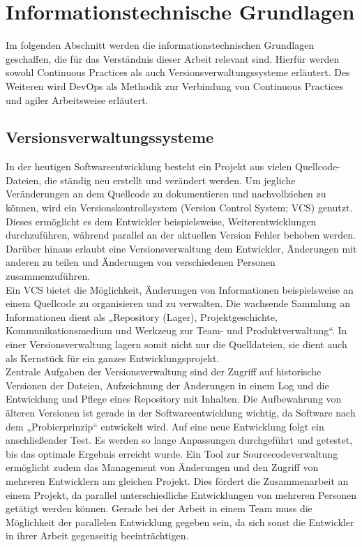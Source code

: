 \chapter{Informationstechnische Grundlagen} 
Im folgenden Abschnitt werden die informationstechnischen Grundlagen geschaffen, die für das Verständnis dieser Arbeit relevant sind. Hierfür werden sowohl Continuous Practices als auch Versionsverwaltungssysteme erläutert. Des Weiteren wird DevOps als Methodik zur Verbindung von Continuous Practices und agiler Arbeitsweise erläutert.
\section{Versionsverwaltungssysteme}\label{vcs}
In der heutigen Softwareentwicklung besteht ein Projekt aus vielen Quellcode-Dateien, die ständig neu erstellt und verändert werden. Um jegliche Veränderungen an dem Quellcode zu dokumentieren und nachvollziehen zu können, wird ein Versionskontrollsystem (Version Control System; VCS) genutzt.\autocite[Vgl.][S.6]{Baerisch.2005}  
Dieses ermöglicht es dem Entwickler beispielsweise, Weiterentwicklungen durchzuführen, während parallel an der aktuellen Version Fehler behoben werden. Darüber hinaus erlaubt eine Versionsverwaltung dem Entwickler, Änderungen mit anderen zu teilen und Änderungen von verschiedenen Personen zusammenzuführen.\autocite[Vgl.][S.9]{Kleine.2012} \\
Ein VCS bietet die Möglichkeit, Änderungen von Informationen beispielsweise an einem Quellcode zu organisieren und zu verwalten. \autocite[Vgl.][S.1]{Pilato.2009}
Die wachsende Sammlung an Informationen dient als „Repository (Lager), Projektgeschichte, Kommunikationsmedium und Werkzeug zur Team- und Produktverwaltung“.\autocite[][S.1]{Loeliger.2010} In einer Versionsverwaltung lagern somit nicht nur die Quelldateien, sie dient auch als Kernstück für ein ganzes Entwicklungsprojekt. \\
Zentrale Aufgaben der Versionsverwaltung sind der Zugriff auf historische Versionen der Dateien, Aufzeichnung der Änderungen in einem Log und die Entwicklung und Pflege eines Repository mit Inhalten. Die Aufbewahrung von älteren Versionen ist gerade in der Softwareentwicklung wichtig, da Software nach dem „Probierprinzip“\autocite[][S.9]{Versteegen.2003} entwickelt wird. Auf eine neue Entwicklung folgt ein anschließender Test. Es werden so lange Anpassungen durchgeführt und getestet, bis das optimale Ergebnis erreicht wurde.\autocite[Vgl.][S.9]{Versteegen.2003}
Ein Tool zur Sourcecodeverwaltung ermöglicht zudem das Management von Änderungen und den Zugriff von mehreren Entwicklern am gleichen Projekt.\autocite[Vgl.][S.1]{Loeliger.2010} Dies fördert die Zusammenarbeit an einem Projekt, da parallel unterschiedliche Entwicklungen von mehreren Personen getätigt werden können. Gerade bei der Arbeit in einem Team muss die Möglichkeit der parallelen Entwicklung gegeben sein, da sich sonst die Entwickler in ihrer Arbeit gegenseitig beeinträchtigen.
